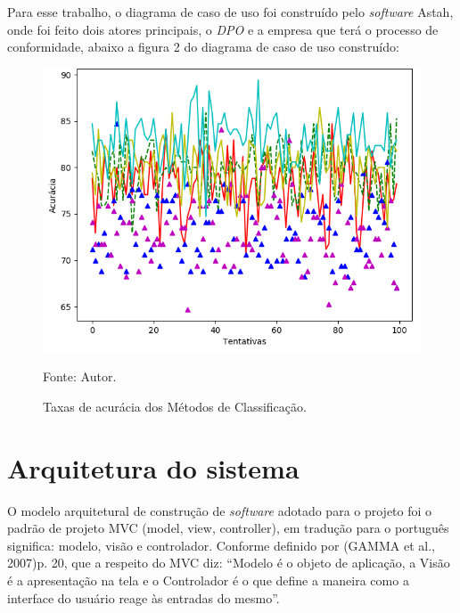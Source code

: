 \documentclass[
	12pt,				%
	openright,			%
	oneside,			%
	a4paper,			%
	english,			%
	french,				%
	spanish,			%
	brazil,				%
	]{abntex2}
\begin{document}
Para esse trabalho, o diagrama de caso de uso foi construído pelo \textit{software} Astah, onde foi feito dois atores principais, o \textit{DPO} e a empresa que terá o processo de conformidade, abaixo a figura 2 do diagrama de caso de uso construído:

\begin{figure}[ht]
    \centering
    \caption{Taxas de acurácia dos Métodos de Classificação.}
    \includegraphics[width=5.0in]{Images/acc-classification.png}
    \label{fig: grafico-acc}
    
    \centering \small Fonte: Autor.
\end{figure}

\section{Arquitetura do sistema}

O modelo arquitetural de construção de \textit{software} adotado para o projeto foi o padrão de projeto MVC (model, view, controller), em tradução para o português significa: modelo, visão e controlador. Conforme definido por (GAMMA et al., 2007)p. 20, que a respeito do MVC diz:  “Modelo é o objeto de aplicação, a Visão é a apresentação na tela e o Controlador é o que define a maneira como a interface do usuário reage às entradas do mesmo”.
\end{document}
